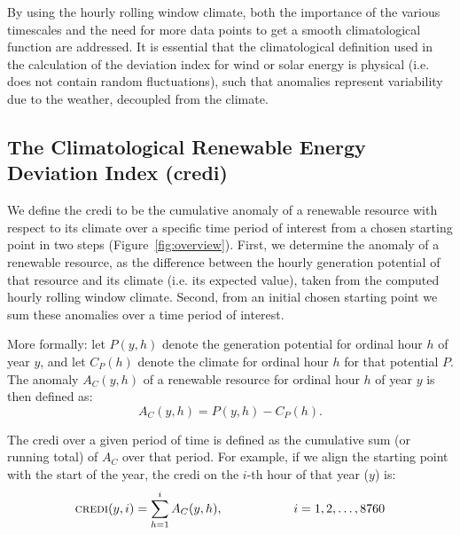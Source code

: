 \documentclass[12pt]{iopart}
\newcommand{\credi}[0]{{\sc credi}}
\begin{document}
By using the hourly rolling window climate, both the importance of the various timescales and the need for more data points to get a smooth climatological function are addressed. 
It is essential that the climatological definition used in the calculation of the deviation index for wind or solar energy is physical (i.e. does not contain random fluctuations), such that anomalies represent variability due to the weather, decoupled from the climate.







\subsection{The Climatological Renewable Energy Deviation Index (\credi)}

We define the \credi{} to be the cumulative anomaly of a renewable resource with respect to its climate over a specific time period of interest from a chosen starting point in two steps (Figure~\ref{fig:overview}). 
First, we determine the anomaly of a renewable resource, as the difference between the hourly generation potential of that resource and its climate (i.e. its expected value), taken from the computed hourly rolling window climate. 
Second, from an initial chosen starting point we sum these anomalies over a time period of interest.

More formally: let $P(y,h)$ denote the generation potential for ordinal hour $h$ of year $y$, and let $C_P(h)$ denote the climate for ordinal hour $h$ for that potential $P$. 
The anomaly $A_C(y,h)$ of a renewable resource for ordinal hour $h$ of year $y$ is then defined as:
\begin{equation}
        A_C(y,h) = P(y,h) - C_P(h).
\end{equation}

The \credi{} over a given period of time is defined as the cumulative sum (or running total) of $A_C$ over that period. 
For example, if we align the starting point with the start of the year, the \credi{} on the $i$-th hour of that year ($y$) is:
\begin{equation}
        \mbox{\credi}(y,i) = \sum_{h=1}^{i} A_C(y,h), \hspace{2cm} i = 1,2,\ldots,8760
\end{equation}
\end{document}
